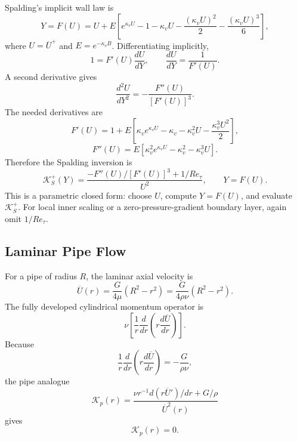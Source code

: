 \documentclass[11pt]{article}
\newcommand{\Ut}{\overline{U}}
\newcommand{\Ret}{Re_\tau}
\newcommand{\kapg}{\mathcal{K}}
\newcommand{\kapv}{\kappa_v}
\begin{document}
Spalding's implicit wall law is
\begin{equation}
Y=F(U)=U+E\left[e^{\kapv U}-1-\kapv U-\frac{(\kapv U)^2}{2}-\frac{(\kapv U)^3}{6}\right],
\label{eq:spalding}
\end{equation}
where $U=\Ut^+$ and $E=e^{-\kapv B}$. Differentiating implicitly,
\begin{equation}
1=F'(U)\frac{dU}{dY},\qquad
\frac{dU}{dY}=\frac{1}{F'(U)}.
\end{equation}
A second derivative gives
\begin{equation}
\frac{d^2U}{dY^2}=-\frac{F''(U)}{[F'(U)]^3}.
\end{equation}
The needed derivatives are
\begin{equation}
F'(U)=1+E\left[\kapv e^{\kapv U}-\kapv-\kapv^2U-\frac{\kapv^3U^2}{2}\right],
\end{equation}
\begin{equation}
F''(U)=E\left[\kapv^2 e^{\kapv U}-\kapv^2-\kapv^3U\right].
\end{equation}
Therefore the Spalding inversion is
\begin{equation}
\boxed{\;\kapg_S^+(Y)=\frac{-F''(U)/[F'(U)]^3+1/\Ret}{U^2},\qquad Y=F(U).\;}
\label{eq:spalding-kappa}
\end{equation}
This is a parametric closed form: choose $U$, compute $Y=F(U)$, and evaluate $\kapg_S^+$. For local inner scaling or a zero-pressure-gradient boundary layer, again omit $1/\Ret$.

\subsection{Laminar Pipe Flow}

For a pipe of radius $R$, the laminar axial velocity is
\begin{equation}
\Ut(r)=\frac{G}{4\mu}(R^2-r^2)=\frac{G}{4\rho\nu}(R^2-r^2).
\end{equation}
The fully developed cylindrical momentum operator is
\begin{equation}
\nu\left[\frac{1}{r}\frac{d}{dr}\left(r\frac{d\Ut}{dr}\right)\right].
\end{equation}
Because
\begin{equation}
\frac{1}{r}\frac{d}{dr}\left(r\frac{d\Ut}{dr}\right)=-\frac{G}{\rho\nu},
\end{equation}
the pipe analogue
\begin{equation}
\kapg_p(r)=\frac{\nu r^{-1}d(r\Ut')/dr+G/\rho}{\Ut^2(r)}
\end{equation}
gives
\begin{equation}
\boxed{\kapg_p(r)=0.}
\end{equation}
\end{document}

